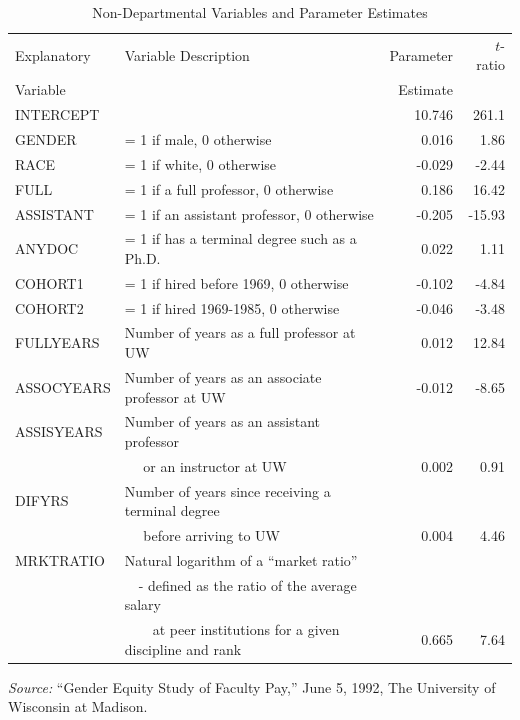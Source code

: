 \begin{exercises}
\begin{table}[h]
\caption{\label{Ex:FacultyPay} \small Non-Departmental Variables and
Parameter Estimates}
\begin{center}
\begin{tabular}{llrr}
\hline
Explanatory  & Variable Description & Parameter& $t$-ratio \\
Variable &  &  Estimate &  \\
\hline INTERCEPT &            &    10.746 &      261.1 \\
    GENDER & = 1 if male, 0 otherwise &     0.016 &       1.86 \\
      RACE & = 1 if white, 0 otherwise &    -0.029 &      -2.44 \\
      FULL & = 1 if a full professor, 0 otherwise &     0.186 &      16.42 \\
 ASSISTANT & = 1 if an assistant professor, 0 otherwise &    -0.205 &     -15.93 \\
    ANYDOC & = 1 if has a terminal degree such as a Ph.D. &     0.022 &       1.11 \\
   COHORT1 & = 1 if hired before 1969, 0 otherwise &    -0.102 &      -4.84 \\
   COHORT2 & = 1 if hired 1969-1985, 0 otherwise &    -0.046 &      -3.48 \\
 FULLYEARS & Number of years as a full professor at UW &     0.012 &      12.84 \\
ASSOCYEARS & Number of years as an associate professor at UW &    -0.012 &      -8.65 \\
ASSISYEARS & Number of years as an assistant professor &    &     \\
    & ~~ or an instructor at UW &     0.002 &        0.91 \\
    DIFYRS & Number of years since receiving a terminal degree&      &        \\
   & ~~ before arriving to UW &     0.004 &       4.46 \\
 MRKTRATIO & Natural logarithm of a ``market ratio''  &      &        \\
&  ~~- defined as the ratio of the average salary  &      &       \\
 &  ~~~~at peer institutions for a given discipline and rank &     0.665 &       7.64 \\
\hline
\end{tabular}

\noindent \textit{Source:} ``Gender Equity Study of Faculty Pay,''
June 5, 1992, The University of Wisconsin at Madison.
\end{center}
\end{table}



\end{exercises}
